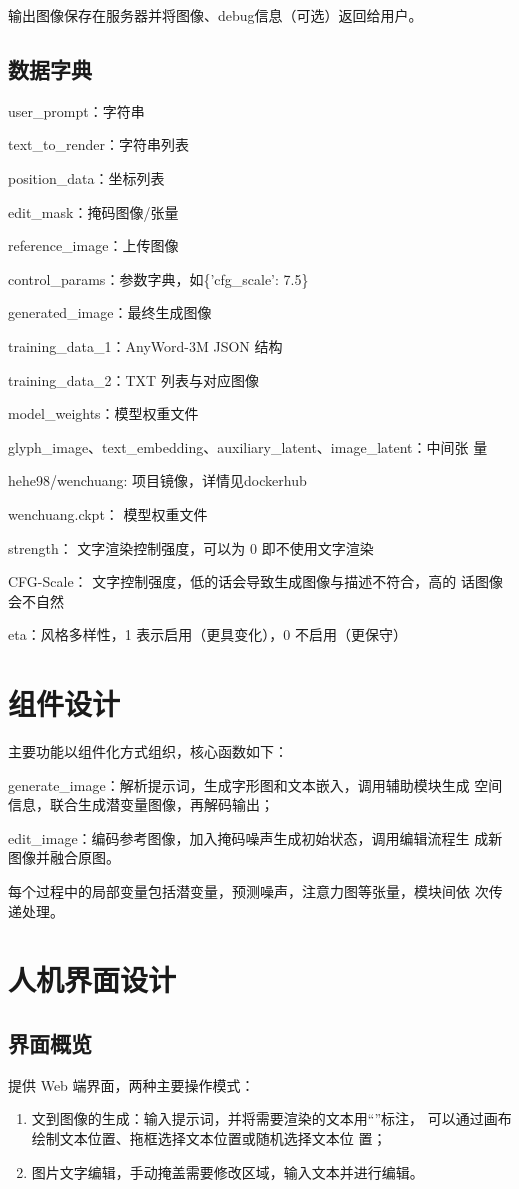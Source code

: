 \documentclass[a4paper,12pt]{article}
\begin{document}
输出图像保存在服务器并将图像、debug信息（可选）返回给用户。
\subsection{数据字典}
user\_prompt：字符串

text\_to\_render：字符串列表

position\_data：坐标列表

edit\_mask：掩码图像/张量

reference\_image：上传图像

control\_params：参数字典，如\{'cfg\_scale': 7.5\}

generated\_image：最终生成图像

training\_data\_1：AnyWord-3M JSON 结构

training\_data\_2：TXT 列表与对应图像

model\_weights：模型权重文件

glyph\_image、text\_embedding、auxiliary\_latent、image\_latent：中间张
量

hehe98/wenchuang: 项目镜像，详情见dockerhub

wenchuang.ckpt： 模型权重文件

strength： 文字渲染控制强度，可以为 0 即不使用文字渲染

CFG-Scale： 文字控制强度，低的话会导致生成图像与描述不符合，高的
话图像会不自然

eta：风格多样性，1 表示启用（更具变化），0 不启用（更保守）

\section{组件设计}
主要功能以组件化方式组织，核心函数如下：

generate\_image：解析提示词，生成字形图和文本嵌入，调用辅助模块生成
空间信息，联合生成潜变量图像，再解码输出；

edit\_image：编码参考图像，加入掩码噪声生成初始状态，调用编辑流程生
成新图像并融合原图。

每个过程中的局部变量包括潜变量，预测噪声，注意力图等张量，模块间依
次传递处理。

\section{人机界面设计}
\subsection{界面概览}
提供 Web 端界面，两种主要操作模式：
\begin{enumerate}
    \item 文到图像的生成：输入提示词，并将需要渲染的文本用“”标注，
    可以通过画布绘制文本位置、拖框选择文本位置或随机选择文本位
    置；
    \item 图片文字编辑，手动掩盖需要修改区域，输入文本并进行编辑。

\end{enumerate}
\end{document}
